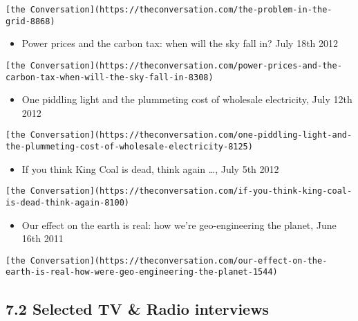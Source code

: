 \documentclass[
]{article}
\providecommand{\tightlist}{%
  \setlength{\itemsep}{0pt}\setlength{\parskip}{0pt}}
\begin{document}
\begin{verbatim}
[the Conversation](https://theconversation.com/the-problem-in-the-grid-8868)
\end{verbatim}

\begin{itemize}
\tightlist
\item
  Power prices and the carbon tax: when will the sky fall in? July 18th
  2012
\end{itemize}

\begin{verbatim}
[the Conversation](https://theconversation.com/power-prices-and-the-carbon-tax-when-will-the-sky-fall-in-8308)
\end{verbatim}

\begin{itemize}
\tightlist
\item
  One piddling light and the plummeting cost of wholesale electricity,
  July 12th 2012
\end{itemize}

\begin{verbatim}
[the Conversation](https://theconversation.com/one-piddling-light-and-the-plummeting-cost-of-wholesale-electricity-8125)
\end{verbatim}

\begin{itemize}
\tightlist
\item
  If you think King Coal is dead, think again \ldots, July 5th 2012
\end{itemize}

\begin{verbatim}
[the Conversation](https://theconversation.com/if-you-think-king-coal-is-dead-think-again-8100)
\end{verbatim}

\begin{itemize}
\tightlist
\item
  Our effect on the earth is real: how we're geo-engineering the planet,
  June 16th 2011
\end{itemize}

\begin{verbatim}
[the Conversation](https://theconversation.com/our-effect-on-the-earth-is-real-how-were-geo-engineering-the-planet-1544)
\end{verbatim}

\hypertarget{selected-tv-radio-interviews}{%
\subsection{7.2 Selected TV \& Radio
interviews}\label{selected-tv-radio-interviews}}
\end{document}
